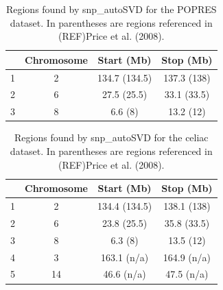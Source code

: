 \documentclass{bioinfo}
\begin{document}
\begin{table}[ht]
\centering
\begin{tabular}{lccc}
  \hline
 & Chromosome & Start (Mb) & Stop (Mb) \\ 
  \hline
1 &  2 & 134.7 (134.5) & 137.3 (138) \\ 
  2 &  6 & 27.5 (25.5) & 33.1 (33.5) \\ 
  3 &  8 & 6.6 (8) & 13.2 (12) \\ 
   \hline
\end{tabular}
\caption{Regions found by snp\_autoSVD for the POPRES dataset. In parentheses are regions referenced in (REF)Price et al. (2008).} 
\label{tab:lrldr-popres}
\end{table}

\begin{table}[ht]
\centering
\begin{tabular}{lccc}
  \hline
 & Chromosome & Start (Mb) & Stop (Mb) \\ 
  \hline
1 &  2 & 134.4 (134.5) & 138.1 (138) \\ 
  2 &  6 & 23.8 (25.5) & 35.8 (33.5) \\ 
  3 &  8 & 6.3 (8) & 13.5 (12) \\ 
  4 &  3 & 163.1 (n/a) & 164.9 (n/a) \\ 
  5 & 14 & 46.6 (n/a) & 47.5 (n/a) \\ 
   \hline
\end{tabular}
\caption{Regions found by snp\_autoSVD for the celiac dataset. In parentheses are regions referenced in (REF)Price et al. (2008).} 
\label{tab:lrldr-celiac}
\end{table}
\end{document}
